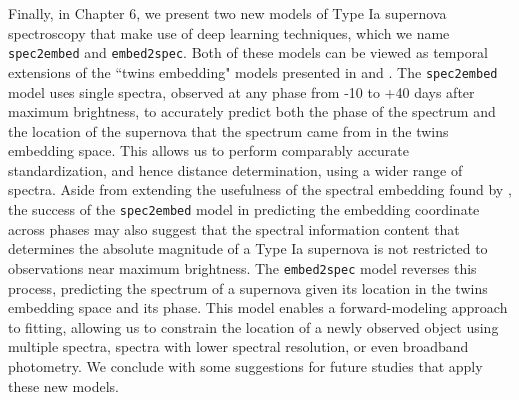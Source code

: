 Finally, in Chapter 6, we present two new models of Type Ia supernova spectroscopy that make use of deep learning techniques, which we name \texttt{spec2embed} and \texttt{embed2spec}. Both of these models can be viewed as temporal extensions of the ``twins embedding" models presented in \citet{boone_twins_2020a} and \citet{boone_twins_2020b}. The \texttt{spec2embed} model uses single spectra, observed at any phase from -10 to +40 days after maximum brightness, to accurately predict both the phase of the spectrum and the location of the supernova that the spectrum came from in the twins embedding space. This allows us to perform comparably accurate standardization, and hence distance determination, using a wider range of spectra. Aside from extending the usefulness of the spectral embedding found by \citet{boone_twins_2020a}, the success of the \texttt{spec2embed} model in predicting the embedding coordinate across phases may also suggest that the spectral information content that determines the absolute magnitude of a Type Ia supernova is not restricted to observations near maximum brightness. The \texttt{embed2spec} model reverses this process, predicting the spectrum of a supernova given its location in the twins embedding space and its phase. This model enables a forward-modeling approach to fitting, allowing us to constrain the location of a newly observed object using multiple spectra, spectra with lower spectral resolution, or even broadband photometry. We conclude with some suggestions for future studies that apply these new models.
